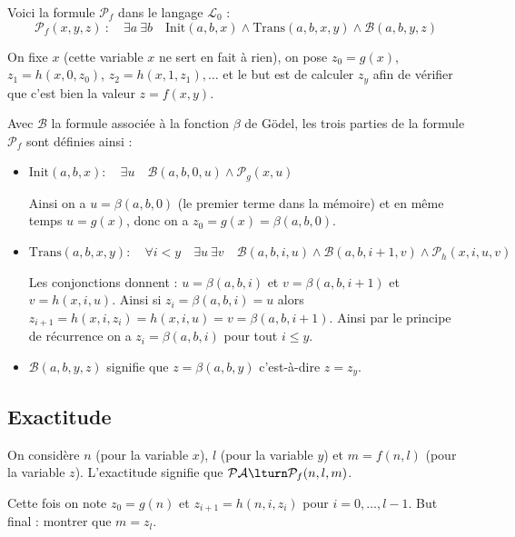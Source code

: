 \documentclass[11pt,class=report,crop=false]{standalone}
\begin{document}
Voici la formule $\mathcal{P}_f$ dans le langage $\mathcal{L}_0$ :
\[ \mathcal{P}_f(x,y,z) \ : \quad \exists a \ \exists b \quad \text{Init}(a,b,x) \land \text{Trans}(a,b,x,y) \land \mathcal{B}(a,b,y,z) \]

On fixe $x$ (cette variable $x$ ne sert en fait à rien), on pose $z_0 = g(x)$, $z_1 = h(x,0,z_0)$, $z_2 = h(x,1,z_1), \dots$ et le but est de calculer $z_y$ afin de vérifier que c'est bien la valeur $z = f(x,y)$.


Avec $\mathcal{B}$ la formule associée à la fonction $\beta$ de Gödel, les trois parties de la formule $\mathcal{P}_f$ sont définies ainsi :
\begin{itemize}
    \item $\text{Init}(a,b,x) : \quad \exists u \quad \mathcal{B}(a,b,0,u) \land \mathcal{P}_g(x,u)$
    
    Ainsi on a $u = \beta(a,b,0)$ (le premier terme dans la mémoire) et en même temps $u = g(x)$, donc on a $z_0 = g(x) = \beta(a,b,0)$.

    \item $\text{Trans}(a,b,x,y) : \quad \forall i < y \quad \exists u \ \exists v \quad \mathcal{B}(a,b,i,u) \land \mathcal{B}(a,b,i+1,v) \land \mathcal{P}_h(x,i,u,v)$
    
    Les conjonctions donnent : $u = \beta(a,b,i)$ et $v = \beta(a,b,i+1)$ et $v = h(x,i,u)$.
    Ainsi si $z_i = \beta(a,b,i) = u$ alors $z_{i+1} = h(x,i,z_i) = h(x,i,u) = v = \beta(a,b,i+1)$. Ainsi par le principe de récurrence on a $z_i = \beta(a,b,i)$ pour tout $i \le y$.

    \item $\mathcal{B}(a,b,y,z)$ signifie que $z = \beta(a,b,y)$ c'est-à-dire $z = z_y$.
\end{itemize}

\subsection{Exactitude}


On considère $n$ (pour la variable $x$), $l$ (pour la variable $y$) et $m = f(n,l)$ (pour la variable $z$).
L'exactitude signifie que $\mathcal{PA} \lturn \mathcal{P}_f(n,l,m)$.

Cette fois on note $z_0 = g(n)$ et $z_{i+1} = h(n,i,z_i)$ pour $i=0,\dots,l-1$.
But final : montrer que $m = z_l$.
\end{document}
